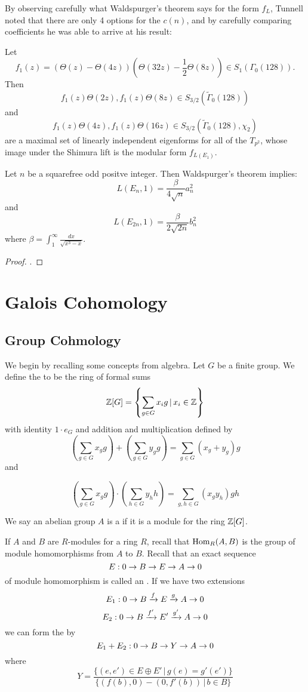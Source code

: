 \documentclass[12pt, a4paper]{report}
\begin{document}
By observing carefully what Waldspurger's theorem
says for the form $f_L$, Tunnell noted that
there are only 4 options for the $c(n)$, and by carefully comparing coefficients
he was able to arrive at his result:

\begin{thm}
  Let
  \[f_1(z) = (\Theta(z)-\Theta(4z))(\Theta(32z) - \frac{1}{2}\Theta(8z))
    \in S_1(\Gamma_0(128)).\]
  Then
  \[f_1(z)\Theta(2z), f_1(z)\Theta(8z) \in S_{3/2}(\tilde{\Gamma}_0(128)) \]
  and
  \[ f_1(z)\Theta(4z), f_1(z) \Theta(16z) \in
    S_{3/2}(\tilde{\Gamma}_0(128), \chi_2)\]
  are a maximal set of linearly independent eigenforms for all of the $T_{p^2}$,
  whose image under the Shimura lift is the modular form $f_{L(E_1)}$.

  Let $n$ be a squarefree odd positve integer. Then Waldspurger's theorem implies:
  \[L(E_n,1) = \frac{\beta}{4\sqrt{n}} a_n^2 \]
  and
  \[L(E_{2n},1) = \frac{\beta}{2 \sqrt{2n}} b_n^2 \]
  where $\beta = \int_1^\infty \frac{dx}{\sqrt{x^3-x}}.$
\end{thm}
\begin{proof}
  \cite[See][Theorem 3, Page 328-329]{Tunnell}.
\end{proof}

\newpage

\chapter{Galois Cohomology}

\section{Group Cohmology}

We begin by recalling some concepts from algebra.
Let $G$ be a finite group. We define the  to
be the ring of formal sums
\[ {\mathbb Z}[G] = \left\{ \sum\limits_{g \in G} x_i g \, | \, x_i \in {\mathbb Z}  \right\} \]
with identity $1 \cdot e_G$ and addition and multiplication defined by
\[\left( \sum\limits_{g \in G} x_g g \right) + \left( \sum\limits_{g \in G} y_g
    g \right)
= \sum\limits_{g \in G} (x_g+y_g)g\]
and

\[\left( \sum\limits_{g \in G} x_g g \right) \cdot \left( \sum\limits_{h \in G} y_h
    h \right)
= \sum\limits_{g, h \in G} (x_gy_h)gh\]

We say an abelian group $A$ is a  if it is a module
for the ring ${\mathbb Z}[G]$. 

If $A$ and $B$ are $R$-modules for a ring $R$, recall that
$\textnormal{Hom}_R(A,B)$ is the group of module homomorphisms from $A$ to $B$.
Recall that an exact sequence
\[E: 0 \rightarrow B \rightarrow E \rightarrow A \rightarrow 0\]
of module homomorphism is called an . If we have
two extensions
\[E_1: 0 \rightarrow B \xrightarrow[]{f} E \xrightarrow[]{g} A \rightarrow 0\]
\[E_2: 0 \rightarrow B \xrightarrow[]{f'} E' \xrightarrow[]{g'} A \rightarrow 0\]
we can form the  by
\[E_1 + E_2 : 0 \rightarrow B \rightarrow Y \rightarrow A \rightarrow 0\]
where
\[Y = \frac{\{(e,e') \in E \oplus E' \, | \, g(e) = g'(e')\}}{\{
    (f(b),0) - (0, f'(b)) \, | \, b \in B\}}\]
\end{document}
